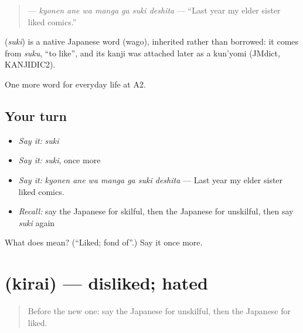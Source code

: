\begin{quote}
\textbf{   } — \emph{kyonen ane wa manga ga suki deshita} — \textquotedblleft{}Last year my elder sister liked comics.\textquotedblright{}
\end{quote}

\begin{cousinweb}
\textbf{} (\emph{suki}) is a native Japanese word (wago), inherited rather than borrowed: it comes from \emph{suku}, \textquotedblleft{}to like\textquotedblright{}, and its kanji was attached later as a kun'yomi (JMdict, KANJIDIC2).
\end{cousinweb}

\begin{grammarlens}[title={What you've built}]
One more word for everyday life at A2.
\end{grammarlens}

\subsection*{Your turn}
\begin{itemize}
\raggedright
  \item \emph{Say it:} \emph{suki}
  \item \emph{Say it:} \emph{suki}, once more
  \item \emph{Say it:} \emph{kyonen ane wa manga ga suki deshita} — Last year my elder sister liked comics.
  \item \emph{Recall:} say the Japanese for skilful, then the Japanese for unskilful, then say \emph{suki} again
\end{itemize}

\begin{tcolorbox}[breakable,colback=teal!4,colframe=teal!35!black,title={Before you move on}]
What does  mean? (\textquotedblleft{}Liked; fond of\textquotedblright{}.) Say it once more.
\end{tcolorbox}
\section[\texorpdfstring{\ja{きらい} (kirai)}{きらい (kirai)}]{ (kirai) — disliked; hated}

\label{lesson:JA-C240-kirai}



\begin{quote}
Before the new one: say the Japanese for unskilful, then the Japanese for liked.
\end{quote}

